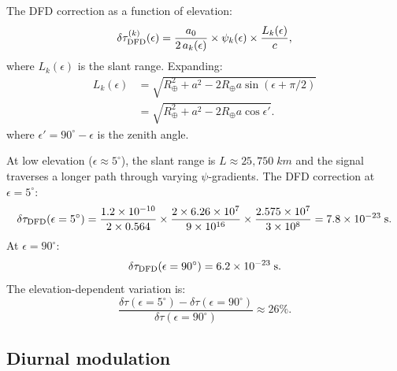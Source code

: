 \documentclass[aps,prd,twocolumn,superscriptaddress,nofootinbib,longbibliography]{revtex4-2}
\begin{document}
The DFD correction as a function of elevation:
\begin{equation}\label{eq:DFD-elevation}
\delta\tau_{\rm DFD}^{(k)}(\epsilon) = \frac{a_0}{2\,a_k(\epsilon)}
\times\psi_k(\epsilon)\times\frac{L_k(\epsilon)}{c},
\end{equation}
where $L_k(\epsilon)$ is the slant range. Expanding:
\begin{align}
L_k(\epsilon) &= \sqrt{R_\oplus^2 + a^2 - 2R_\oplus a\sin(\epsilon+\pi/2)} \nonumber\\
&= \sqrt{R_\oplus^2 + a^2 - 2R_\oplus a\cos\epsilon'}.
\end{align}
where $\epsilon' = 90^\circ - \epsilon$ is the zenith angle.

At low elevation ($\epsilon \approx 5^\circ$), the slant range is
$L \approx 25{,}750\;\si{km}$ and the signal traverses a longer path
through varying $\psi$-gradients. The DFD correction at $\epsilon = 5^\circ$:
\begin{equation}
\delta\tau_{\rm DFD}(\epsilon=5^\circ) = \frac{1.2\times10^{-10}}{2\times0.564}
\times\frac{2\times6.26\times10^{7}}{9\times10^{16}}\times\frac{2.575\times10^7}{3\times10^8}
= 7.8\times10^{-23}\;\si{s}.
\end{equation}
At $\epsilon = 90^\circ$:
\begin{equation}
\delta\tau_{\rm DFD}(\epsilon=90^\circ) = 6.2\times10^{-23}\;\si{s}.
\end{equation}
The elevation-dependent variation is:
\begin{equation}
\frac{\delta\tau(\epsilon=5^\circ) - \delta\tau(\epsilon=90^\circ)}
{\delta\tau(\epsilon=90^\circ)} \approx 26\%.
\end{equation}

\subsection{Diurnal modulation}\label{sec:diurnal}
\end{document}
